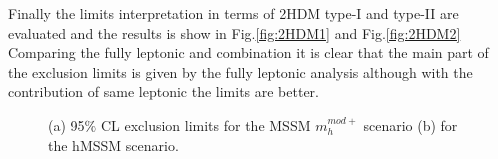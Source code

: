 Finally the limits interpretation in terms of 2HDM type-I and type-II are evaluated and the results is show in Fig.\ref{fig:2HDM1} and Fig.\ref{fig:2HDM2}
Comparing the fully leptonic and combination it is clear that the main part of the exclusion limits is given by the fully leptonic analysis 	
although with the contribution of same leptonic the limits are better.
\begin{figure}[htb]
\centering
{}
\caption{(a) 95$\%$ CL exclusion limits for the MSSM $m_h^{mod+}$ scenario (b) for the hMSSM scenario.}
    \label{fig:MSSM2}
\end{figure}


